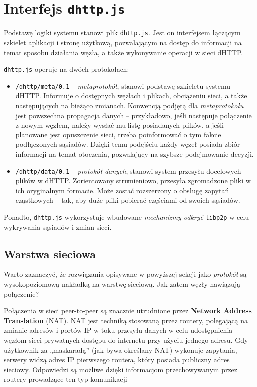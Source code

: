 \section{Interfejs \texttt{dhttp.js}}

Podstawę logiki systemu stanowi plik \texttt{dhttp.js}. Jest on interfejsem łączącym szkielet aplikacji i stronę użytkową, pozwalającym na dostęp do informacji na temat sposobu działania węzła, a także wykonywanie operacji w sieci dHTTP.

\texttt{dhttp.js} operuje na dwóch protokołach:

\begin{itemize}
    \item \texttt{/dhttp/meta/0.1} -- {\em metaprotokół}, stanowi podstawę szkieletu systemu dHTTP. Informuje o dostępnych węzłach i plikach, obciążeniu sieci, a także następujących na bieżąco zmianach. Konwencją podjętą dla {\em metaprotokołu} jest powszechna propagacja danych -- przykładowo, jeśli następuje połączenie z nowym węzłem,  należy wysłać mu listę posiadanych plików, a jeśli planowane jest opuszczenie sieci, trzeba poinformować o tym fakcie podłączonych sąsiadów. Dzięki temu podejściu każdy węzeł posiada zbiór informacji na temat otoczenia, pozwalający na szybsze podejmowanie decyzji.

    \item \texttt{/dhttp/data/0.1} -- {\em protokół danych}, stanowi system przesyłu docelowych plików w dHTTP. Zorientowany strumieniowo, przesyła zgromadzone pliki w ich oryginalnym formacie. Może zostać rozszerzony o obsługę zapytań cząstkowych -- tak, aby duże pliki pobierać częściami od swoich sąsiadów.
\end{itemize}
Ponadto, \texttt{dhttp.js} wykorzystuje wbudowane {\em mechanizmy odkryć} \texttt{libp2p} w celu wykrywania sąsiadów i zmian sieci.



\subsection{Warstwa sieciowa}
Warto zaznaczyć, że rozwiązania opisywane w powyższej sekcji jako {\em protokół} są wysokopoziomową nakładką na warstwę sieciową. Jak zatem węzły nawiązują połączenie?

Połączenia w sieci peer-to-peer są znacznie utrudnione przez \textbf{ Network Address Translation} (NAT). NAT jest techniką stosowaną przez routery, polegającą na zmianie adresów i portów IP w toku przesyłu danych w celu udostępnienia węzłom sieci prywatnych dostępu do internetu przy użyciu jednego adresu. Gdy użytkownik za „maskaradą” (jak bywa określany NAT) wykonuje zapytania, serwery widzą adres IP pierwszego routera, który posiada publiczny adres sieciowy. Odpowiedzi są możliwe dzięki informacjom przechowywanym przez routery prowadzące ten typ komunikacji.

